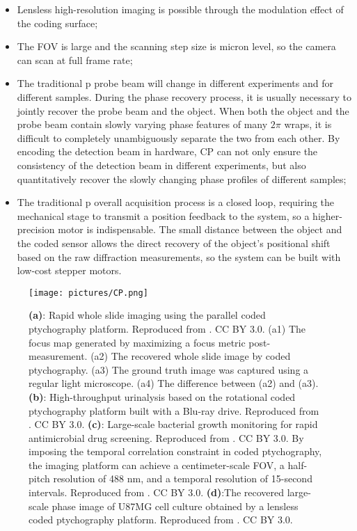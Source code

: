 \documentclass[journal,review,submit,pdftex,moreauthors]{Definitions/mdpi}
\begin{document}
\begin{itemize}
    \item  Lensless high-resolution imaging is possible through the modulation effect of the coding surface;
    
    \item The FOV is large and the scanning step size is micron level, so the camera can scan at full frame rate;
    
    \item The traditional p probe beam will change in different experiments and for different samples. During the phase recovery process, it is usually necessary to jointly recover the probe beam and the object. When both the object and the probe beam contain slowly varying phase features of many $2\pi$  wraps, it is difficult to completely unambiguously separate the two from each other. By encoding the detection beam in hardware, CP can not only ensure the consistency of the detection beam in different experiments, but also quantitatively recover the slowly changing phase profiles of different samples;
    
    \item The traditional p overall acquisition process is a closed loop, requiring the mechanical stage to transmit a position feedback to the system, so a higher-precision motor is indispensable. The small distance between the object and the coded sensor allows the direct recovery of the object’s positional shift based on the raw diffraction measurements, so the system can be built with low-cost stepper motors.
\end{itemize}

\begin{figure}[H]
    \centering
    \texttt{[image: pictures/CP.png]}
    \caption{\textbf{(a)}: Rapid whole slide imaging using the parallel coded ptychography platform. Reproduced from \cite{jiang2021resolution}. CC BY 3.0. (a1) The focus map generated by maximizing a focus metric post-measurement. (a2) The recovered whole slide image by coded ptychography. (a3) The ground truth image was captured using a regular light microscope. (a4) The difference between (a2) and (a3). \textbf{(b)}: High-throughput urinalysis based on the rotational coded ptychography platform built with a Blu-ray drive. Reproduced from \cite{jiang2022blood}. CC BY 3.0. \textbf{(c)}: Large-scale bacterial growth monitoring for rapid antimicrobial drug screening. Reproduced from \cite{jiang2022ptychographic}. CC BY 3.0. By imposing the temporal correlation constraint in coded ptychography, the imaging platform can achieve a centimeter-scale FOV, a half-pitch resolution of 488 nm, and a temporal resolution of 15-second intervals. Reproduced from \cite{jiang2022ptychographic}. CC BY 3.0. \textbf{(d)}:The recovered large-scale phase image of U87MG cell culture obtained by a lensless coded ptychography platform. Reproduced from \cite{jiang2020wide}. CC BY 3.0.}
    \label{fig:enter-label}
\end{figure}
\end{document}
